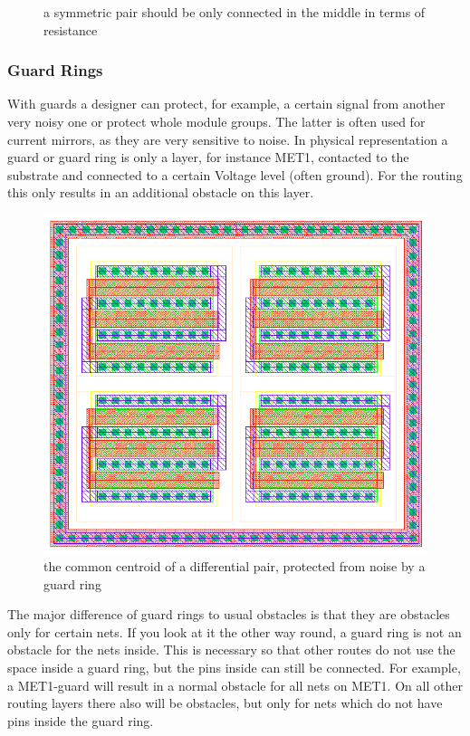 \begin{figure}
	\centering
	
 	\caption{a symmetric pair should be only connected in the middle in terms of resistance}
	\label{fig:symmetric_routing}
\end{figure}

\subsubsection{Guard Rings}
With guards  a designer can protect, for example, a certain signal from another very noisy one or protect whole module groups. The latter is often used for current mirrors, as they are very sensitive to noise. In physical representation a guard or guard ring is only a layer, for instance MET1, contacted to the substrate and connected to a certain Voltage level (often ground). For the routing this only results in an additional obstacle on this layer.

\begin{figure}
	\centering
	\includegraphics[scale=.6]{FIG/guard_ring.png}
  	\caption{the common centroid of a differential pair, protected from noise by a guard ring}
	\label{fig:guard_ring}
\end{figure}

The major difference of guard rings to usual obstacles is that they are obstacles only for certain nets. If you look at it the other way round, a guard ring is not an obstacle for the nets inside. This is necessary so that other routes do not use the space inside a guard ring, but the pins inside can still be connected. For example, a MET1-guard will result in a normal obstacle for all nets on MET1. On all other routing layers there also will be obstacles, but only for nets which do not have pins inside the guard ring.

